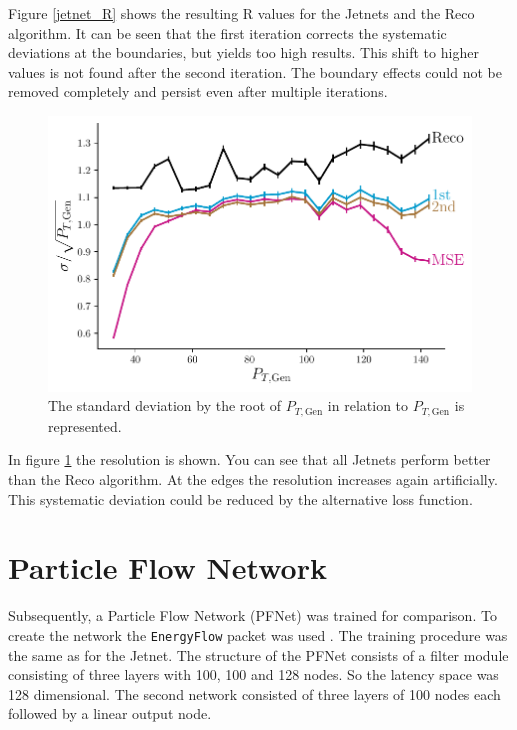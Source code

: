 \documentclass[12pt, a4paper]{thesis}
\begin{document}
Figure \ref{jetnet_R} shows the resulting R values for the Jetnets and
the Reco algorithm. It can be seen that the first iteration corrects
the systematic deviations at the boundaries, but yields too high
results. This shift to higher values is not found after the second
iteration. The boundary effects could not be removed completely and
persist even after multiple iterations.

\begin{figure}[H]
  \centering
  \includegraphics[width=.9\linewidth]{../images/jetnet_res.pdf}
  \caption{ The standard deviation by the root of \(P_{T, \text{Gen}}\)
    in relation to \(P_{T, \text{Gen}}\) is represented.}
  \label{jetnet_res}
\end{figure}

In figure \ref{jetnet_res} the resolution is shown. You can see that all
Jetnets perform better than the Reco algorithm. At the edges the
resolution increases again artificially. This systematic deviation
could be reduced by the alternative loss function.

\section{Particle Flow Network}
\label{sec:org307355e}

Subsequently, a Particle Flow Network (PFNet) was trained for
comparison. To create the network the \texttt{EnergyFlow} packet was used
\cite{komiske19_energ_flow_networ}. The training procedure was the same
as for the Jetnet. The structure of the PFNet consists of a filter
module consisting of three layers with 100, 100 and 128 nodes. So the
latency space was 128 dimensional. The second network consisted of
three layers of 100 nodes each followed by a linear output node.
\end{document}
